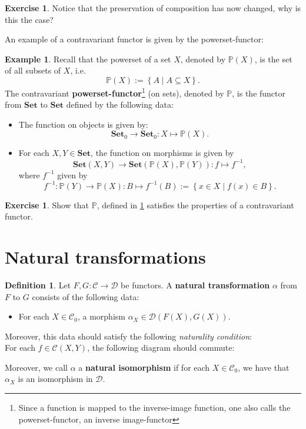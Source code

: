 \documentclass[a4paper,10pt]{scrartcl}
\theoremstyle{plain}
\theoremstyle{definition}
\newtheorem{dfn}[thm]{Definition}
\newtheorem{exa}[thm]{Example}
\newtheorem{exer}[thm]{Exercise}
\newcommand{\Cat}[1]{\mathcal{#1}}
\newcommand{\CC}{\Cat{C}}
\newcommand{\DD}{\Cat{D}}
\newcommand{\Catb}[1]{\mathbf{#1}}
\newcommand{\SET}{\Catb{Set}}
\newcommand{\Ob}[1]{{#1}_0}
\newcommand{\CHom}[3]{{#1}(#2,#3)}
\begin{document}
\begin{exer} Notice that the preservation of composition has now changed, why is this the case?
\end{exer}

An example of a contravariant functor is given by the powerset-functor:
\begin{exa} \label{example:powersetfunctor} Recall that the powerset of a set $X$, denoted by $\mathbb{P}(X)$, is the set of all subsets of $X$, i.e. 
\[
\mathbb{P}(X) :=  \left\{A \mid A\subseteq X\right\}.
\]
The contravariant \textbf{powerset-functor}\footnote{Since a function is mapped to the inverse-image function, one also calls the powerset-functor, an inverse image-functor} (on sets), denoted by $\mathbb{P}$, is the functor from $\SET$ to $\SET$ defined by the following data:
\begin{itemize}
\item The function on objects is given by:
\[
\Ob{\SET}\to \Ob{\SET}: X\mapsto \mathbb{P}(X).
\]
\item For each $X,Y\in\SET$, the function on morphisms is given by
\[
\CHom{\SET}{X}{Y} \to \CHom{\SET}{\mathbb{P}(X)}{\mathbb{P}(Y)}: f\mapsto f^{-1},
\]
where $f^{-1}$ given by
\[
f^{-1}:\mathbb{P}(Y)\to \mathbb{P}(X): B\mapsto f^{-1}(B) := \left\{x\in X \mid f(x)\in B\right\}.
\]
\end{itemize}
\end{exa}

\begin{exer} Show that $\mathbb{P}$, defined in \cref{example:powersetfunctor} satisfies the properties of a contravariant functor.
\end{exer}


\section{Natural transformations}
\label{sec:nat-trans}

\begin{dfn} Let $F,G: \CC\to\DD$ be functors. A \textbf{natural transformation} $\alpha$ from $F$ to $G$ consists of the following data:
\begin{itemize}
\item For each $X\in \Ob{\CC}$, a morphism $\alpha_X \in \CHom{\DD}{F(X)}{G(X)}$.
\end{itemize}
Moreover, this data should satisfy the following \textit{naturality condition}:\\
For each $f\in \CHom{\CC}{X}{Y}$, the following diagram should commute:
\begin{center}
\end{center}
Moreover, we call $\alpha$ a \textbf{natural isomorphism} if for each $X\in\Ob{\CC}$, we have that $\alpha_X$ is an isomorphism in $\DD$.
\end{dfn}
\end{document}
